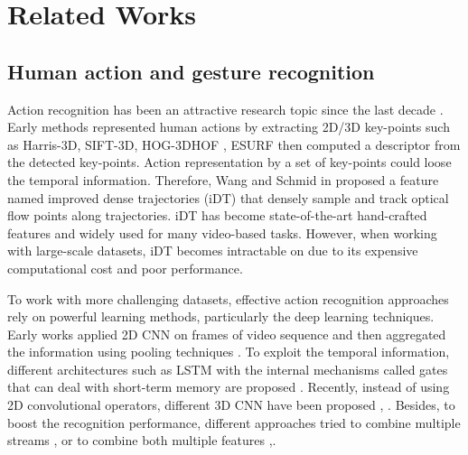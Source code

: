 
\section{Related Works} \label{sec:related_works}

    \subsection{Human action and gesture recognition}
        Action recognition has been an attractive research topic since the last decade \cite{zhang2019comprehensive}.
        Early methods represented human actions by extracting 2D/3D key-points such as Harris-3D, SIFT-3D, HOG-3DHOF \cite{laptev2008learning}, ESURF \cite{willems2008efficient} then computed a descriptor from the detected key-points.
        Action representation  by a set of key-points could loose the temporal information. Therefore, Wang and Schmid in \cite{wang2013action} proposed a feature named improved dense trajectories (iDT) that densely sample and track optical flow points along trajectories.
        iDT has become state-of-the-art hand-crafted features and widely used for many video-based tasks.
        However, when working with large-scale datasets, iDT becomes intractable on due to its expensive computational cost and poor performance. 

        To work with more challenging datasets, effective action recognition approaches rely on powerful learning methods, particularly the deep learning techniques.
        Early works applied 2D CNN on frames of video sequence and then aggregated the information using pooling techniques \cite{karpathy2014large}.
        To exploit the temporal information, different architectures such as LSTM with the internal mechanisms called gates that can deal with short-term memory are proposed \cite{sun2017lattice}.
        Recently, instead of using 2D convolutional operators, different 3D CNN have been proposed  \cite{ji20123d, tran2015learning}, \cite{varol2017long}.
        Besides, to boost the recognition performance, different approaches tried to combine multiple streams \cite{wang2015towards, feichtenhofer2016convolutional}, \cite{khong2018improving} or to combine both multiple features \cite{wang2015action},\cite{christoph2016spatiotemporal}. %

